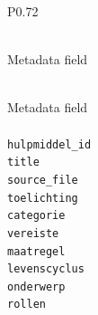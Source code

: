 \begingroup
\small
\setlength{\tabcolsep}{4pt}
\renewcommand{\arraystretch}{1.08}
\setlength{\LTcapwidth}{\textwidth}
\setlength{\LTleft}{0pt plus 1fill}
\setlength{\LTright}{0pt plus 1fill}
\begin{longtable}{P{0.72\textwidth}}
\caption{Metadata fields present in Algoritmekader hulpmiddelen files.} \label{tab:algoritmekader-hulpmiddelen-metadata-fields} \\
\toprule
Metadata field \\
\midrule
\endfirsthead
\caption[]{Metadata fields present in Algoritmekader hulpmiddelen files.} \\
\toprule
Metadata field \\
\midrule
\endhead
\midrule
{} \\
\midrule
\endfoot
\bottomrule
\endlastfoot
\texttt{hulpmiddel\_\allowbreak{}id} \\
\texttt{title} \\
\texttt{source\_\allowbreak{}file} \\
\texttt{toelichting} \\
\texttt{categorie} \\
\texttt{vereiste} \\
\texttt{maatregel} \\
\texttt{levenscyclus} \\
\texttt{onderwerp} \\
\texttt{rollen} \\
\end{longtable}
\endgroup
